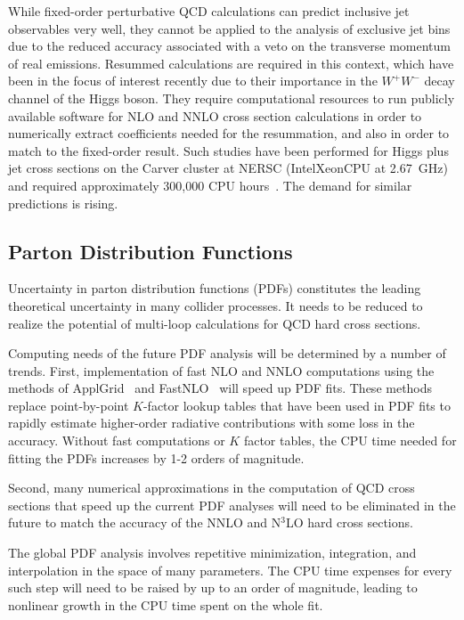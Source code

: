 While fixed-order perturbative QCD calculations can predict inclusive
jet observables very well, they cannot be applied to the analysis of 
exclusive jet bins due to the reduced accuracy associated with
a veto on the transverse momentum of real emissions.
Resummed calculations are required in this context, which have been
in the focus of interest recently due to their importance in the
$W^+W^-$ decay channel of the Higgs boson. They require computational
resources to run publicly available software for NLO and NNLO cross
section calculations in order to numerically extract coefficients needed
for the resummation, and also in order to match to the fixed-order result. 
Such studies have been performed for Higgs plus jet cross sections
on the Carver cluster at NERSC (Intel\registered Xeon\registered CPU at 2.67~GHz) 
and required approximately 300,000 CPU hours~\cite{Stewart:2013faa}. 
The demand for similar predictions is rising.

\subsection{Parton Distribution Functions}

Uncertainty in parton distribution functions (PDFs) constitutes the
leading theoretical uncertainty in many collider processes. It needs
to be reduced to realize the potential of multi-loop calculations for
QCD hard cross sections.

Computing needs of the future PDF analysis will be determined by a
number of trends.  First, implementation of fast NLO and NNLO
computations using the methods of ApplGrid~\cite{Carli:2010rw} 
and FastNLO~\cite{Kluge:2006xs} will speed up
PDF fits. These methods replace point-by-point $K$-factor lookup tables that
have been used in PDF fits to rapidly estimate higher-order radiative
contributions with some loss in the accuracy.  Without fast
computations or $K$ factor tables, the CPU time needed for fitting the PDFs
increases by 1-2 orders of magnitude.

Second, many numerical approximations in the computation of QCD cross
sections that speed up the current PDF analyses will need to be
eliminated in the future to match the accuracy of the NNLO and N$^3$LO
hard cross sections.

The global PDF analysis involves repetitive minimization, integration,
and interpolation in the space of many parameters.  The CPU time expenses
for every such step will need to be raised by up to an order of
magnitude, leading to nonlinear growth in the CPU time spent on the whole fit.


